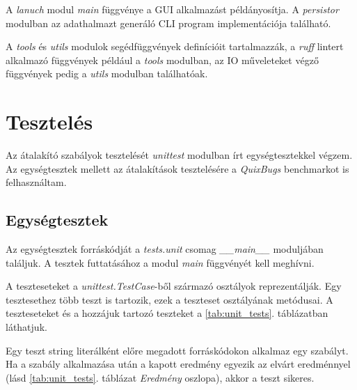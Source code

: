A \emph{lanuch} modul \emph{main} függvénye a GUI alkalmazást példányosítja.
A \emph{persistor} modulban az adathalmazt generáló CLI program implementációja található.

A \emph{tools} és \emph{utils} modulok segédfüggvények definícióit tartalmazzák,
a \emph{ruff} lintert alkalmazó függvények például a \emph{tools} modulban,
az IO műveleteket végző függvények pedig a \emph{utils} modulban találhatóak.

\pagebreak

\section{Tesztelés}

Az átalakító szabályok tesztelését \emph{unittest} modulban írt egységtesztekkel végzem.
Az egységtesztek mellett az átalakítások tesztelésére a \emph{QuixBugs} benchmarkot \cite{QuixBugs} is felhasználtam.

\subsection{Egységtesztek}

Az egységtesztek forráskódját a \emph{tests.unit} csomag \emph{\_\_main\_\_}
moduljában találjuk. A tesztek futtatásához a modul \emph{main} függvényét kell meghívni.

A teszteseteket a \emph{unittest.TestCase}-ből származó osztályok reprezentálják.
Egy tesztesethez több teszt is tartozik, ezek a teszteset osztályának metódusai.
A teszteseteket és a hozzájuk tartozó teszteket a \ref{tab:unit_tests}. táblázatban láthatjuk.

Egy teszt string literálként előre megadott forráskódokon alkalmaz egy szabályt.
Ha a szabály alkalmazása után a kapott eredmény egyezik az elvárt eredménnyel
(lásd \ref{tab:unit_tests}. táblázat \emph{Eredmény} oszlopa), akkor a teszt sikeres.


